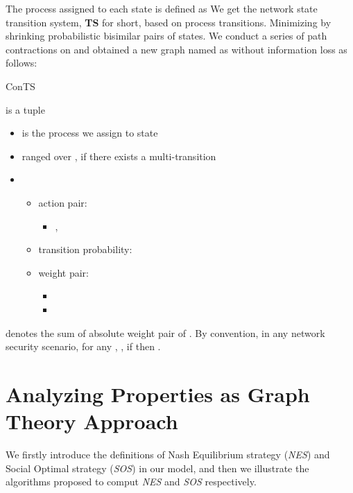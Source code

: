 \documentclass{acm_proc_article-sp}
\begin{document}
The process assigned to each state  is defined as 
We get the network state transition system, \textbf{TS} for short, based on process transitions. Minimizing  by shrinking probabilistic bisimilar pairs of states. We conduct a series of path contractions on  and obtained a new graph named as  without information loss as follows:
\begin{definition}
\begin{bf}ConTS\end{bf} is a tuple 
\begin{itemize}
\item  is the process we assign to state 
\item  ranged over , if there exists a multi-transition 
\item 
\begin{itemize}
\item action pair: 
\begin{itemize}
\item , 
\end{itemize}
\item transition probability: 
\item weight pair: 
\begin{itemize}
\item 
\item  
\end{itemize}
\end{itemize}
\end{itemize}
\end{definition}
 denotes the sum of absolute weight pair of .
By convention, in any network security scenario, for any , , if  then .

\section{Analyzing Properties as Graph Theory Approach}
We firstly introduce the definitions of Nash Equilibrium strategy (\textit{NES}) and Social Optimal strategy (\textit{SOS}) in our model, and then we illustrate the algorithms proposed to comput \textit{NES} and \textit{SOS} respectively.
\end{document}
